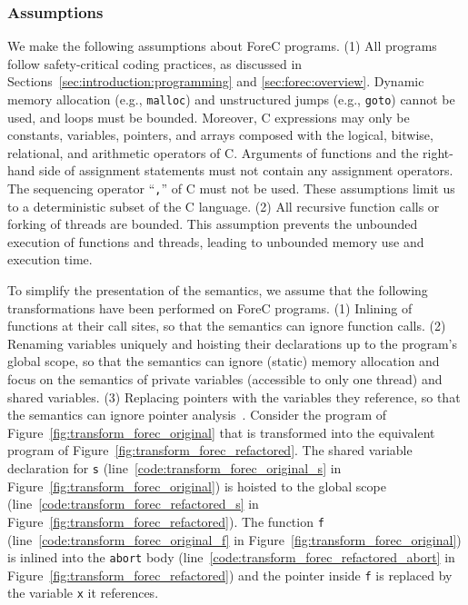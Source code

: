 \subsubsection{Assumptions}
\label{sec:forec_semantics:assumptions}
We make the following assumptions about ForeC programs. 
(1) All programs follow safety-critical coding practices,
as discussed in Sections~\ref{sec:introduction:programming}
and \ref{sec:forec:overview}.
Dynamic memory allocation (e.g., \texttt{malloc}) and unstructured 
jumps (e.g., \texttt{goto}) cannot be used, and loops must be bounded. 
Moreover, C expressions may only be constants, variables, 
pointers, and arrays composed with the logical, bitwise, relational, 
and arithmetic operators of C. Arguments of functions and the 
right-hand side of assignment statements must not contain any assignment
operators. The sequencing operator ``\texttt{,}'' of C must not be used. These 
assumptions limit us to a deterministic subset of the C language. 
(2) All recursive function calls or forking of threads are bounded.
This assumption prevents the unbounded 
execution of functions and threads, leading to unbounded
memory use and execution time. 

To simplify the presentation of the semantics, we assume that the 
following transformations have been performed on ForeC programs. 
(1) Inlining of functions at their call sites, so that the semantics can
ignore function calls.
(2) Renaming variables uniquely and hoisting their declarations 
up to the program's global scope, so that the semantics can ignore 
(static) memory allocation and focus on the semantics of private variables 
(accessible to only one thread) and shared variables.
(3) Replacing pointers with the variables they reference, so that the 
semantics can ignore pointer analysis~\cite{BussBSE10,HardekopfL11}.
Consider the program of 
Figure~\ref{fig:transform_forec_original} that is 
transformed into the equivalent program of 
Figure~\ref{fig:transform_forec_refactored}.
The shared variable declaration for \verb$s$ 
(line~\ref{code:transform_forec_original_s} in Figure~\ref{fig:transform_forec_original}) 
is hoisted to the global scope 
(line~\ref{code:transform_forec_refactored_s} in Figure~\ref{fig:transform_forec_refactored}). 
The function \verb$f$ 
(line~\ref{code:transform_forec_original_f} in Figure~\ref{fig:transform_forec_original})
is inlined into the \verb$abort$ body 
(line~\ref{code:transform_forec_refactored_abort} in Figure~\ref{fig:transform_forec_refactored}) 
and the pointer inside \verb$f$ is replaced by the variable \verb$x$ it references.



